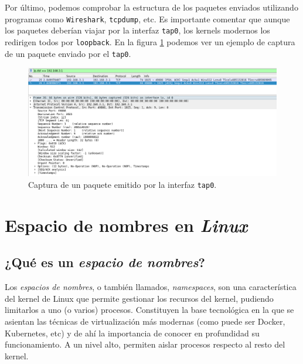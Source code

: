 \documentclass[a4paper, oneside, 12pt]{book}
\begin{document}
	\pagebreak
	
	\noindent Por último, podemos comprobar la estructura de los paquetes enviados utilizando programas como \texttt{Wireshark}, \texttt{tcpdump}, etc. Es importante comentar que aunque los paquetes deberían viajar por la interfaz \texttt{tap0}, los kernels modernos los redirigen todos por \texttt{loopback}. En la figura \ref{img: wireshark tuntap} podemos ver un ejemplo de captura de un paquete enviado por el \texttt{tap0}.
	
	\begin{figure}[h!]
		\begin{center}
			\includegraphics[width=1\textwidth]{img/wireshark_tuntap.png}
			\caption{Captura de un paquete emitido por la interfaz \texttt{tap0}.}
			\label{img: wireshark tuntap}
		\end{center}
	\end{figure}
	
	
	\pagebreak
	
	\chapter{Espacio de nombres en \textit{Linux}}
	\label{sect: espacio nombres}
	
	\section{¿Qué es un \textit{espacio de nombres}?}
	\noindent Los \textit{espacios de nombres}, o también llamados, \textit{namespaces}, son una característica del kernel de Linux que permite gestionar los recursos del kernel, pudiendo limitarlos a uno (o varios) procesos. Constituyen la base tecnológica en la que se asientan las técnicas de virtualización más modernas (como puede ser Docker, Kubernetes, etc) y de ahí la importancia de conocer en profundidad su funcionamiento. A un nivel alto, permiten aislar procesos respecto al resto del kernel. \\
	
\end{document}
